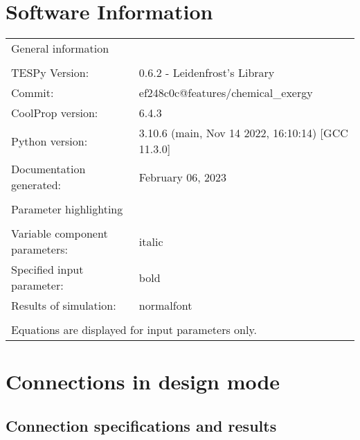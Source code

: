 \documentclass[]{article}
\newcommand{\iftab}{\fontshape{sl}\selectfont}
\newcommand{\bftab}{\fontseries{b}\selectfont}
\begin{document}
\section*{Software Information}

\begin{table}[H]
\begin{tabular}{ll}
\bftab General information&\\
& \\
TESPy Version:&0.6.2 - Leidenfrost's Library\\
Commit:&ef248c0c@features/chemical\_exergy\\
CoolProp version:&6.4.3\\
Python version:&3.10.6 (main, Nov 14 2022, 16:10:14) [GCC 11.3.0]\\
Documentation generated:&February 06, 2023\\
& \\
\bftab Parameter highlighting&\\
& \\
Variable component parameters:& \iftab italic\\
Specified input parameter:& \bftab bold\\
Results of simulation:& normalfont \\
& \\
\multicolumn{2}{l}{\iftab Equations are displayed for input parameters only.}\\
\end{tabular}
\end{table}
\newpage\section{Connections in design mode}

\subsection{Connection specifications and results}
\end{document}
